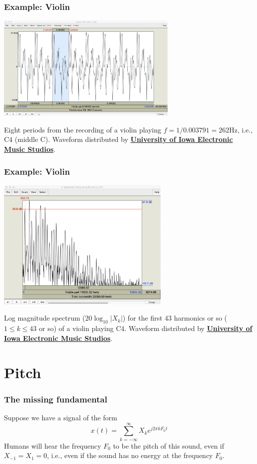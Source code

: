 \documentclass{beamer}
\begin{document}
\begin{frame}
  \frametitle{Example: Violin}

  \centerline{\includegraphics[height=2in]{violin_waveform.png}}
    Eight periods from the recording of a violin playing $f=1/0.003791=262$Hz, i.e., C4 (middle C).
    Waveform distributed by
    \href{http://theremin.music.uiowa.edu/MIS.html}{\bf\color{blue}University of Iowa Electronic Music Studios}.
\end{frame}

\begin{frame}
  \frametitle{Example: Violin}

  \centerline{\includegraphics[height=2.5in]{violin_spectrum.png}}
    Log magnitude spectrum ($20\log_{10}|X_k|$) for the first 43 harmonics or so
    ($1\le k\le 43$ or so) of a violin playing C4.
    Waveform distributed by
    \href{http://theremin.music.uiowa.edu/MIS.html}{\bf\color{blue}University of Iowa Electronic Music Studios}.
\end{frame}

\section[Pitch]{Pitch}
\setcounter{subsection}{1}

\begin{frame}
  \frametitle{The missing fundamental}

  Suppose we have a signal of the form
  \[
  x(t) = \sum_{k=-\infty}^{\infty} X_k e^{j2\pi k F_0 t}
  \]
  Humans will hear the frequency $F_0$ to be the pitch of this sound,
  even if $X_{-1}=X_1=0$, i.e., even if the sound has no energy at the
  frequency $F_0$.
  
\end{frame}
\end{document}
